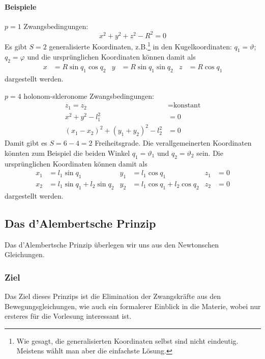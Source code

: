 \paragraph{Beispiele}

\begin{beispiel*}
$p = 1$ Zwangsbedingungen:
$$x^2 + y^2 + z^2 - R^2 = 0$$
Es gibt $S = 2$ generalisierte Koordinaten, z.B.\footnote{Wie gesagt, die generalisierten Koordinaten selbst sind nicht eindeutig. Meistens wählt man aber die einfachste Lösung.} in den Kugelkoordinaten: $q_1 = \vartheta$; $q_2 = \varphi$ und die ursprünglichen Koordinaten können damit als 
\begin{align*}
x &= R \sin{q_1} \cos{q_2} & y &= R \sin q_1 \sin q_2 & z &= R \cos q_1
\end{align*}
dargestellt werden.
\end{beispiel*}

\begin{beispiel*} $p = 4$ holonom-skleronome Zwangsbedingungen:
\begin{align*}
	z_1 = z_2 &= \text{konstant}\\
	x^2 + y^2 - l^2_1 &= 0\\
	(x_1 - x_2)^2 + (y_1 + y_2)^2 - l_2^2 &= 0 
\end{align*}
Damit gibt es $S = 6 - 4= 2$ Freiheitsgrade. Die verallgemeinerten Koordinaten könnten zum Beispiel die beiden Winkel $q_1 = \vartheta_1$ und $q_2 = \vartheta_2$ sein. Die ursprünglichen Koordinaten können damit als 
\begin{align*}
x_1 &= l_1 \sin q_1 & y_1 &= l_1 \cos q_1 & z_1 &= 0\\
x_2 &= l_1 \sin q_1 + l_2 \sin q_2 & y_2 &= l_1 \cos q_1 + l_2 \cos q_2 & z_2 &= 0
\end{align*}
dargestellt werden.
\end{beispiel*}


\subsection{Das d'Alembertsche Prinzip}
Das d'Alembertsche Prinzip überlegen wir uns aus den Newtonschen Gleichungen.

\subsubsection{Ziel}
Das Ziel dieses Prinzips ist die Elimination der Zwangskräfte aus den Bewegungsgleichungen, wie auch ein formalerer Einblick in die Materie, wobei nur ersteres für die Vorlesung interessant ist.

